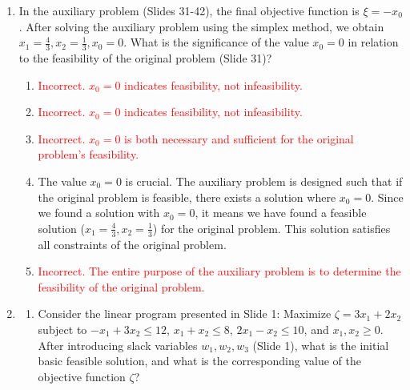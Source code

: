 \documentclass{article}%
\newcommand{\incorrect}[1]{\textcolor{red}{#1}}
\begin{document}
\begin{enumerate}
\begin{enumerate}
\item The original problem is feasible if and only if the optimal value of the auxiliary objective function $ \xi $ is 0.  If a feasible solution to the original problem exists, we can set $ x_0 = 0 $ in the auxiliary problem, making $ \xi = 0 $. Conversely, if the optimal $ \xi = 0 $, it means a feasible solution to the original problem has been found.%
\item \incorrect{Incorrect. An unbounded $ \xi $ would also indicate infeasibility in the original problem.}%
\item \incorrect{Incorrect. The auxiliary problem is constructed to be feasible.}%
\end{enumerate}%
\vspace{1em}%
\item In the auxiliary problem (Slides 31-42), the final objective function is $ \xi = -x_0 $.  After solving the auxiliary problem using the simplex method, we obtain $ x_1 = \frac{4}{3}, x_2 = \frac{1}{3}, x_0 = 0 $. What is the significance of the value $ x_0 = 0 $ in relation to the feasibility of the original problem (Slide 31)?%
\begin{enumerate}%
\item \incorrect{Incorrect. $ x_0 = 0 $ indicates feasibility, not infeasibility.}%
\item \incorrect{Incorrect. $ x_0 = 0 $ indicates feasibility, not infeasibility.}%
\item \incorrect{Incorrect. $ x_0 = 0 $ is both necessary and sufficient for the original problem's feasibility.}%
\item The value $ x_0 = 0 $ is crucial.  The auxiliary problem is designed such that if the original problem is feasible, there exists a solution where $ x_0 = 0 $.  Since we found a solution with $ x_0 = 0 $, it means we have found a feasible solution ($ x_1 = \frac{4}{3}, x_2 = \frac{1}{3} $) for the original problem.  This solution satisfies all constraints of the original problem.%
\item \incorrect{Incorrect. The entire purpose of the auxiliary problem is to determine the feasibility of the original problem.}%
\end{enumerate}%
\vspace{1em}%
\item%
\begin{enumerate}%
\item Consider the linear program presented in Slide 1: Maximize $ \zeta = 3x_1 + 2x_2 $ subject to $ -x_1 + 3x_2 \le 12 $, $ x_1 + x_2 \le 8 $, $ 2x_1 - x_2 \le 10 $, and $ x_1, x_2 \ge 0 $.  After introducing slack variables $ w_1, w_2, w_3 $ (Slide 1), what is the initial basic feasible solution, and what is the corresponding value of the objective function $ \zeta $?%

\end{enumerate}
\end{enumerate}
\end{document}
